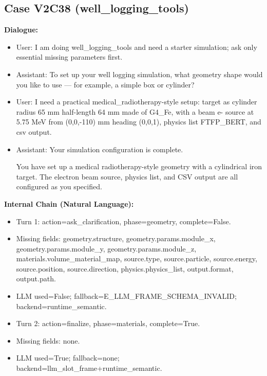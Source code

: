 \documentclass[11pt]{ctexart}
\begin{document}
\subsection{Case V2C38 (well\_logging\_tools)}
\textbf{Dialogue:}
\begin{itemize}
\item User: I am doing well\_logging\_tools and need a starter simulation; ask only essential missing parameters first.
\item Assistant: To set up your well logging simulation, what geometry shape would you like to use — for example, a simple box or cylinder?
\item User: I need a practical medical\_radiotherapy-style setup: target as cylinder radius 65 mm half-length 64 mm made of G4\_Fe, with a beam e- source at 5.75 MeV from (0,0,-110) mm heading (0,0,1), physics list FTFP\_BERT, and csv output.
\item Assistant: Your simulation configuration is complete.

You have set up a medical radiotherapy-style geometry with a cylindrical iron target. The electron beam source, physics list, and CSV output are all configured as you specified.
\end{itemize}
\textbf{Internal Chain (Natural Language):}
\begin{itemize}
\item Turn 1: action=ask\_clarification, phase=geometry, complete=False.
\item Missing fields: geometry.structure, geometry.params.module\_x, geometry.params.module\_y, geometry.params.module\_z, materials.volume\_material\_map, source.type, source.particle, source.energy, source.position, source.direction, physics.physics\_list, output.format, output.path.
\item LLM used=False; fallback=E\_LLM\_FRAME\_SCHEMA\_INVALID; backend=runtime\_semantic.
\item Turn 2: action=finalize, phase=materials, complete=True.
\item Missing fields: none.
\item LLM used=True; fallback=none; backend=llm\_slot\_frame+runtime\_semantic.
\end{itemize}
\end{document}
